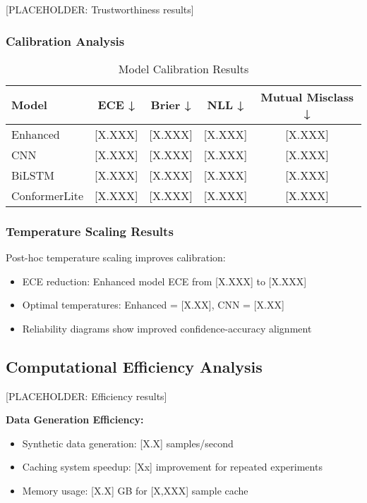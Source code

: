 \documentclass[journal]{IEEEtran}
\begin{document}
[PLACEHOLDER: Trustworthiness results]

\subsubsection{Calibration Analysis}

\begin{table}[ht]
\centering
\caption{Model Calibration Results}
\begin{tabular}{@{}lcccc@{}}
\toprule
Model & ECE ↓ & Brier ↓ & NLL ↓ & Mutual Misclass ↓ \\
\midrule
Enhanced & [X.XXX] & [X.XXX] & [X.XXX] & [X.XXX] \\
CNN & [X.XXX] & [X.XXX] & [X.XXX] & [X.XXX] \\
BiLSTM & [X.XXX] & [X.XXX] & [X.XXX] & [X.XXX] \\
ConformerLite & [X.XXX] & [X.XXX] & [X.XXX] & [X.XXX] \\
\bottomrule
\end{tabular}
\end{table}

\subsubsection{Temperature Scaling Results}

Post-hoc temperature scaling improves calibration:
\begin{itemize}
\item ECE reduction: Enhanced model ECE from [X.XXX] to [X.XXX]
\item Optimal temperatures: Enhanced = [X.XX], CNN = [X.XX]
\item Reliability diagrams show improved confidence-accuracy alignment
\end{itemize}

\subsection{Computational Efficiency Analysis}

[PLACEHOLDER: Efficiency results]

\textbf{Data Generation Efficiency:}
\begin{itemize}
\item Synthetic data generation: [X.X] samples/second
\item Caching system speedup: [Xx] improvement for repeated experiments
\item Memory usage: [X.X] GB for [X,XXX] sample cache
\end{itemize}
\end{document}
